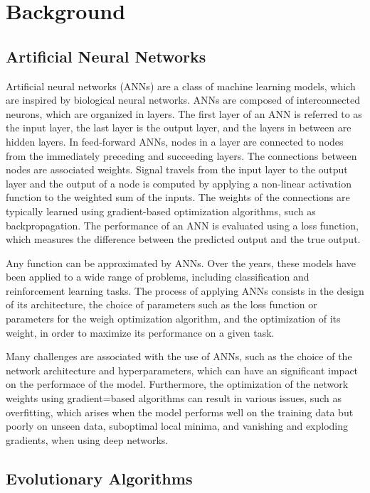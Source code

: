 \chapter{Background}
\label{chap:background}

\section{Artificial Neural Networks}

Artificial neural networks (ANNs) are a class of machine learning models, which are inspired by biological neural networks. ANNs are composed of interconnected
neurons, which are organized in layers. The first layer of an ANN is referred to as the input layer, the last layer is the output layer, and the layers
in between are hidden layers. In feed-forward ANNs, nodes in a layer are connected to nodes from the immediately preceding and succeeding layers. The connections between nodes
are associated weights.  Signal travels from the input layer to the output layer and the output of a node is computed by applying a non-linear activation function
to the weighted sum of the inputs. The weights of the connections are typically learned using gradient-based optimization algorithms, such as backpropagation.
The performance of an ANN is evaluated using a loss function, which measures the difference between the predicted output and the true output.


Any function can be approximated by ANNs. Over the years, these models have been applied to a wide range of problems, including classification and reinforcement
learning tasks. The process of applying ANNs consists in the design of its architecture, the choice of parameters such as the loss function or parameters for the
weigh optimization algorithm, and the optimization of its weight, in order to maximize its performance on a given task.

Many challenges are associated with the use of ANNs, such as the choice of the network architecture and hyperparameters, which can have an significant
impact on the performace of the model. Furthermore, the optimization of the network weights using gradient=based algorithms can result in various issues, such
as overfitting, which arises when the model performs well on the training data but poorly on unseen data, suboptimal local minima, and vanishing and
exploding gradients, when using deep networks.

\section{Evolutionary Algorithms}

